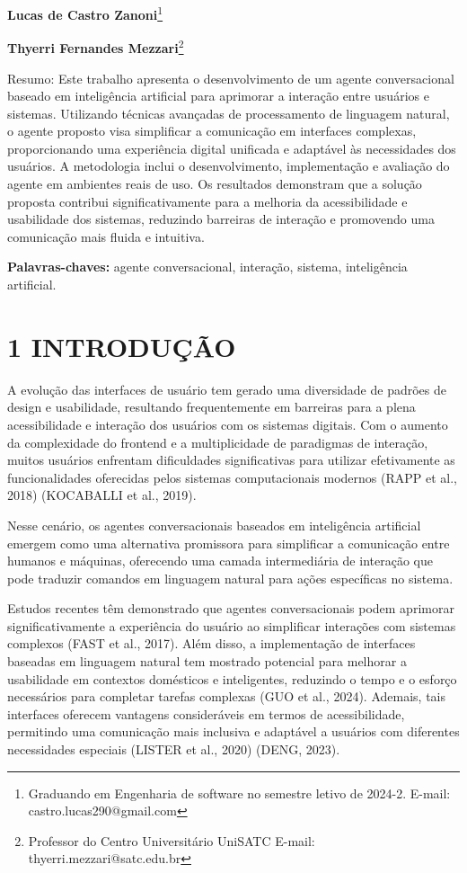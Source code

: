 \documentclass[
]{article}
\begin{document}
\textbf{Lucas de Castro Zanoni}\footnote{Graduando em Engenharia de
  software no semestre letivo de 2024-2. E-mail:
  castro.lucas290@gmail.com}

\textbf{Thyerri Fernandes Mezzari}\footnote{Professor do Centro
  Universitário UniSATC E-mail: thyerri.mezzari@satc.edu.br}

Resumo: Este trabalho apresenta o desenvolvimento de um agente
conversacional baseado em inteligência artificial para aprimorar a
interação entre usuários e sistemas. Utilizando técnicas avançadas de
processamento de linguagem natural, o agente proposto visa simplificar a
comunicação em interfaces complexas, proporcionando uma experiência
digital unificada e adaptável às necessidades dos usuários. A
metodologia inclui o desenvolvimento, implementação e avaliação do
agente em ambientes reais de uso. Os resultados demonstram que a solução
proposta contribui significativamente para a melhoria da acessibilidade
e usabilidade dos sistemas, reduzindo barreiras de interação e
promovendo uma comunicação mais fluida e intuitiva.

\textbf{Palavras-chaves:} agente conversacional, interação, sistema,
inteligência artificial.

\section{1 INTRODUÇÃO}\label{introduuxe7uxe3o}

A evolução das interfaces de usuário tem gerado uma diversidade de
padrões de design e usabilidade, resultando frequentemente em barreiras
para a plena acessibilidade e interação dos usuários com os sistemas
digitais. Com o aumento da complexidade do frontend e a multiplicidade
de paradigmas de interação, muitos usuários enfrentam dificuldades
significativas para utilizar efetivamente as funcionalidades oferecidas
pelos sistemas computacionais modernos (RAPP et al., 2018) (KOCABALLI et
al., 2019).

Nesse cenário, os agentes conversacionais baseados em inteligência
artificial emergem como uma alternativa promissora para simplificar a
comunicação entre humanos e máquinas, oferecendo uma camada
intermediária de interação que pode traduzir comandos em linguagem
natural para ações específicas no sistema.

Estudos recentes têm demonstrado que agentes conversacionais podem
aprimorar significativamente a experiência do usuário ao simplificar
interações com sistemas complexos (FAST et al., 2017). Além disso, a
implementação de interfaces baseadas em linguagem natural tem mostrado
potencial para melhorar a usabilidade em contextos domésticos e
inteligentes, reduzindo o tempo e o esforço necessários para completar
tarefas complexas (GUO et al., 2024). Ademais, tais interfaces oferecem
vantagens consideráveis em termos de acessibilidade, permitindo uma
comunicação mais inclusiva e adaptável a usuários com diferentes
necessidades especiais (LISTER et al., 2020) (DENG, 2023).
\end{document}
